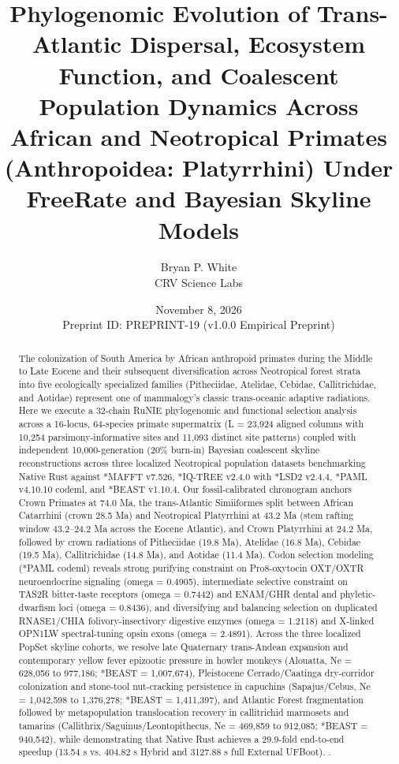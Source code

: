 \documentclass[10pt,letterpaper]{article}
\title{\textbf{Phylogenomic Evolution of Trans-Atlantic Dispersal, Ecosystem Function, and Coalescent Population Dynamics Across African and Neotropical Primates (Anthropoidea: Platyrrhini) Under FreeRate and Bayesian Skyline Models}}
\author{Bryan P. White \\ CRV Science Labs}
\date{November 8, 2026 \\ \small Preprint ID: PREPRINT-19 (v1.0.0 Empirical Preprint)}
\begin{document}
\maketitle

\begin{abstract}
The colonization of South America by African anthropoid primates during the Middle to Late Eocene and their subsequent diversification across Neotropical forest strata into five ecologically specialized families (Pitheciidae, Atelidae, Cebidae, Callitrichidae, and Aotidae) represent one of mammalogy's classic trans-oceanic adaptive radiations. Here we execute a 32-chain RuNIE phylogenomic and functional selection analysis across a 16-locus, 64-species primate supermatrix (L = 23,924 aligned columns with 10,254 parsimony-informative sites and 11,093 distinct site patterns) coupled with independent 10,000-generation (20\% burn-in) Bayesian coalescent skyline reconstructions across three localized Neotropical population datasets benchmarking Native Rust against *MAFFT v7.526, *IQ-TREE v2.4.0 with *LSD2 v2.4.4, *PAML v4.10.10 codeml, and *BEAST v1.10.4. Our fossil-calibrated chronogram anchors Crown Primates at 74.0 Ma, the trans-Atlantic Simiiformes split between African Catarrhini (crown 28.5 Ma) and Neotropical Platyrrhini at 43.2 Ma (stem rafting window 43.2–24.2 Ma across the Eocene Atlantic), and Crown Platyrrhini at 24.2 Ma, followed by crown radiations of Pitheciidae (19.8 Ma), Atelidae (16.8 Ma), Cebidae (19.5 Ma), Callitrichidae (14.8 Ma), and Aotidae (11.4 Ma). Codon selection modeling (*PAML codeml) reveals strong purifying constraint on Pro8-oxytocin OXT/OXTR neuroendocrine signaling (omega = 0.4905), intermediate selective constraint on TAS2R bitter-taste receptors (omega = 0.7442) and ENAM/GHR dental and phyletic-dwarfism loci (omega = 0.8436), and diversifying and balancing selection on duplicated RNASE1/CHIA folivory-insectivory digestive enzymes (omega = 1.2118) and X-linked OPN1LW spectral-tuning opsin exons (omega = 2.4891). Across the three localized PopSet skyline cohorts, we resolve late Quaternary trans-Andean expansion and contemporary yellow fever epizootic pressure in howler monkeys (Alouatta, Ne = 628,056 to 977,186; *BEAST = 1,007,674), Pleistocene Cerrado/Caatinga dry-corridor colonization and stone-tool nut-cracking persistence in capuchins (Sapajus/Cebus, Ne = 1,042,598 to 1,376,278; *BEAST = 1,411,397), and Atlantic Forest fragmentation followed by metapopulation translocation recovery in callitrichid marmosets and tamarins (Callithrix/Saguinus/Leontopithecus, Ne = 469,859 to 912,085; *BEAST = 940,542), while demonstrating that Native Rust achieves a 29.9-fold end-to-end speedup (13.54 s vs. 404.82 s Hybrid and 3127.88 s full External UFBoot). \cite{White2026RuNIE,Bond2015,Seiffert2020,Perelman2011,Springer2012,Kuderna2023,Surridge2003,VargasPinilla2015,Suchard2018,Katoh2013,Minh2020,To2016,Yang2007}.
\end{abstract}
\end{document}
